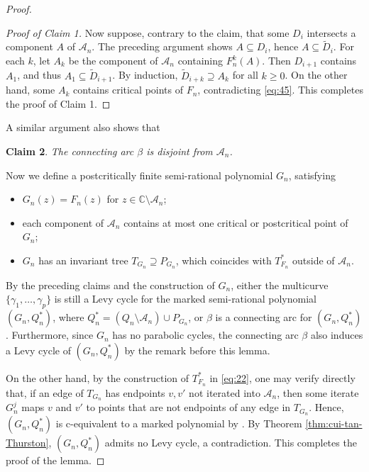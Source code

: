 \documentclass[a4paper,reqno,times, 11pt]{amsart}
\theoremstyle{remark}
\theoremstyle{plain}
\numberwithin{equation}{section}
\def\AAA{{\cal A}}
\def\C{\mbox{$\mathbb C$}}
\def\cal{\mathcal}
\begin{document}
\begin{proof}
\begin{proof}[Proof of Claim 1]
				Now suppose, contrary to the claim, that some \(D_i\) intersects a component \(A\) of \(\mathcal{A}_n\). The preceding argument shows \(A \subseteq D_i\), hence \(A \subseteq \widetilde{D}_i\). For each \(k\), let \(A_k\) be the component of \(\mathcal{A}_n\) containing \(F_n^k(A)\). Then \(D_{i+1}\) contains \(A_1\), and thus \(A_1 \subseteq \widetilde{D}_{i+1}\). By induction, \(\widetilde{D}_{i+k} \supseteq A_k\) for all \(k \geq 0\). On the other hand, some \(A_k\) contains critical points of \(F_n\), contradicting \eqref{eq:45}. This completes the proof of Claim 1.
			\end{proof}
			
A similar argument also shows that \vspace{8pt}
			
			{\bf Claim 2}. \emph{The connecting arc $\beta$ is disjoint from $\AAA_n$. }	\vspace{8pt}		
			
			
			Now we define a postcritically finite semi-rational polynomial $G_n$, satisfying
			\begin{itemize}
				\item $G_n(z)=F_n(z)$ for $z\in\C\setminus \AAA_n$;
				\item each component of $\AAA_n$ contains at most one critical or postcritical point of $G_n$;
				\item $G_n$ has an invariant tree $T_{G_n}\supseteq P_{G_n}$, which coincides with $T_{F_n}^*$ outside of $\AAA_n$.
			\end{itemize}
			
			By the preceding claims and the construction of $G_n$, either the multicurve $\{\gamma_1,\ldots,\gamma_p\}$ is  still a Levy cycle for the marked semi-rational polynomial $(G_n, Q_n^*)$, where $Q_n^* = (Q_n \setminus \mathcal{A}_n) \cup P_{G_n}$, or $\beta$ is a connecting arc for $(G_n,Q_n^*)$. Furthermore, since $G_n$ has no parabolic cycles, the connecting arc $\beta$ also induces a Levy cycle of $(G_n,Q_n^*)$ by the remark before this lemma.
			
			On the other hand, by the construction of $T_{F_n}^*$ in \eqref{eq:22},
			one may verify directly that, if an edge of $T_{G_n}$ has endpoints $v, v'$ not iterated into $\mathcal{A}_n$, then some iterate $G_n^j$ maps $v$ and $v'$ to points that are not endpoints of any edge in $T_{G_n}$. Hence, $(G_n, Q_n^*)$ is c-equivalent to a marked polynomial by \cite[Theorem 1.1]{Poi}. By Theorem \ref{thm:cui-tan-Thurston}, $(G_n, Q_n^*)$ admits no Levy cycle, a contradiction.
			This completes the proof of the lemma.
		\end{proof}
		
\end{document}
